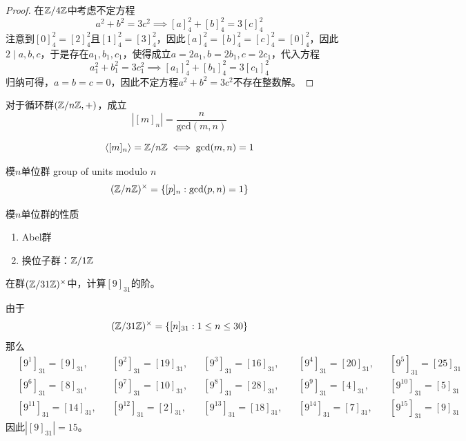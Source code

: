 \begin{proof}
	在$\mathbb{Z}/4\mathbb{Z}$中考虑不定方程
	$$
	a^2+b^2=3c^2\implies [a]^2_4+[b]^2_4=3[c]^2_4
	$$
	注意到$[0]_4^2=[2]^2_4$且$[1]_4^2=[3]^2_4$，因此$[a]_4^2=[b]_4^2=[c]_4^2=[0]_4^2$，因此$2\mid a,b,c$，于是存在$a_1,b_1,c_1$，使得成立$a=2a_1,b=2b_1,c=2c_1$，代入方程
	$$
	a_1^2+b_1^2=3c_1^2\implies [a_1]^2_4+[b_1]^2_4=3[c_1]^2_4
	$$
	归纳可得，$a=b=c=0$，因此不定方程$a^2+b^2=3c^2$不存在整数解。
\end{proof}

\begin{proposition}
	对于循环群$(\mathbb{Z}/n\mathbb{Z},+)$，成立
	$$
	|[m]_n|=\frac{n}{\mathrm{gcd}(m,n)}
	$$
\end{proposition}

\begin{corollary}
	$$
	\langle [m]_n \rangle=\mathbb{Z}/n\mathbb{Z}\iff\mathrm{gcd}(m,n)=1
	$$
\end{corollary}

\begin{definition}{模$n$单位群 group of units modulo $n$}
	$$
	(\mathbb{Z}/n\mathbb{Z})^{\times}=\{ [p]_n:\mathrm{gcd}(p,n)=1 \}
	$$
\end{definition}

\begin{proposition}{模$n$单位群的性质}
	\begin{enumerate}
		\item Abel群
		\item 换位子群：$\mathbb{Z}/1\mathbb{Z}$
	\end{enumerate}
\end{proposition}

\begin{problem}
	在群$(\mathbb{Z}/31\mathbb{Z})^{\times}$中，计算$[9]_{31}$的阶。
\end{problem}

\begin{solution}
	由于
	$$
	(\mathbb{Z}/31\mathbb{Z})^{\times}=\{ [n]_{31}:1\le n\le30 \}
	$$
	那么
	\begin{align*}
		&[9^1]_{31}=[9]_{31},&&
		[9^2]_{31}=[19]_{31},&&
		[9^3]_{31}=[16]_{31},&&
		[9^4]_{31}=[20]_{31},&&
		[9^5]_{31}=[25]_{31}\\
		&[9^6]_{31}=[8]_{31},&&
		[9^7]_{31}=[10]_{31},&&
		[9^8]_{31}=[28]_{31},&&
		[9^9]_{31}=[4]_{31},&&
		[9^{10}]_{31}=[5]_{31}\\
		&[9^{11}]_{31}=[14]_{31},&&
		[9^{12}]_{31}=[2]_{31},&&
		[9^{13}]_{31}=[18]_{31},&&
		[9^{14}]_{31}=[7]_{31},&&
		[9^{15}]_{31}=[9]_{31}
	\end{align*}
	因此$|[9]_{31}|=15$。
\end{solution}

